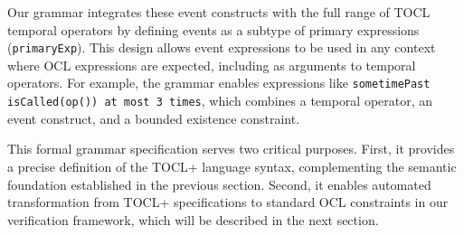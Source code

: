 Our grammar integrates these event constructs with the full range of TOCL temporal 
operators by defining events as a subtype of primary expressions (\texttt{primaryExp}). 
This design allows event expressions to be used in any context where OCL expressions 
are expected, including as arguments to temporal operators. For example, the grammar 
enables expressions like \texttt{sometimePast isCalled(op()) at most 3 times}, which 
combines a temporal operator, an event construct, and a bounded existence constraint.

This formal grammar specification serves two critical purposes. First, it provides a 
precise definition of the TOCL+ language syntax, complementing the semantic 
foundation established in the previous section. Second, it enables automated 
transformation from TOCL+ specifications to standard OCL constraints in our 
verification framework, which will be described in the next section.